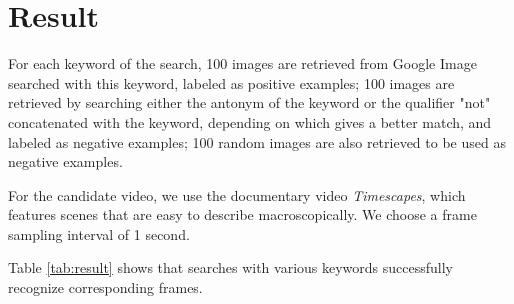 \documentclass{article}
\begin{document}
\section{Result}

For each keyword of the search, 100 images are retrieved from Google Image searched with this keyword, labeled as positive examples; 100 images are retrieved by searching either the antonym of the keyword or the qualifier "not" concatenated with the keyword, depending on which gives a better match, and labeled as negative examples; 100 random images are also retrieved to be used as negative examples. 

For the candidate video, we use the documentary video \textit{Timescapes}, which features scenes that are easy to describe macroscopically. We choose a frame sampling interval of 1 second. 

Table \ref{tab:result} shows that searches with various keywords successfully recognize corresponding frames. 
\end{document}

